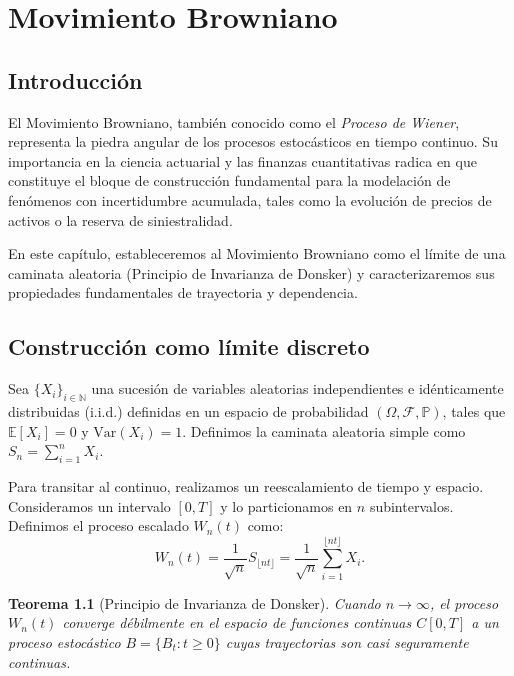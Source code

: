 \documentclass[12pt]{book}
\newtheorem{theorem}{Teorema}[chapter]
\begin{document}
\chapter{Movimiento Browniano}

\section{Introducción}
El Movimiento Browniano, también conocido como el \textit{Proceso de Wiener}, representa la piedra angular de los procesos estocásticos en tiempo continuo. Su importancia en la ciencia actuarial y las finanzas cuantitativas radica en que constituye el bloque de construcción fundamental para la modelación de fenómenos con incertidumbre acumulada, tales como la evolución de precios de activos o la reserva de siniestralidad.

En este capítulo, estableceremos al Movimiento Browniano como el límite de una caminata aleatoria (Principio de Invarianza de Donsker) y caracterizaremos sus propiedades fundamentales de trayectoria y dependencia.

\section{Construcción como límite discreto}

Sea $\{X_i\}_{i \in \mathbb{N}}$ una sucesión de variables aleatorias independientes e idénticamente distribuidas (i.i.d.) definidas en un espacio de probabilidad $(\Omega, \mathcal{F}, \mathbb{P})$, tales que $\mathbb{E}[X_i] = 0$ y $\mathrm{Var}(X_i) = 1$. Definimos la caminata aleatoria simple como $S_n = \sum_{i=1}^n X_i$.

Para transitar al continuo, realizamos un reescalamiento de tiempo y espacio. Consideramos un intervalo $[0,T]$ y lo particionamos en $n$ subintervalos. Definimos el proceso escalado $W_n(t)$ como:
\[
    W_n(t) = \frac{1}{\sqrt{n}} S_{\lfloor nt \rfloor} = \frac{1}{\sqrt{n}} \sum_{i=1}^{\lfloor nt \rfloor} X_i.
\]

\begin{theorem}[Principio de Invarianza de Donsker]
Cuando $n \to \infty$, el proceso $W_n(t)$ converge débilmente en el espacio de funciones continuas $C[0,T]$ a un proceso estocástico $B = \{B_t : t \ge 0\}$ cuyas trayectorias son casi seguramente continuas.
\end{theorem}
\end{document}
